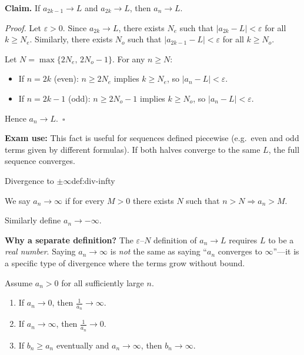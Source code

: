 \begin{examplebox}[title={Worked Example (Tutorial 7, Q3): If odd and even subsequences both converge to $L$, then $a_n\to L$}]

\textbf{Claim.} If $a_{2k-1}\to L$ and $a_{2k}\to L$, then $a_n\to L$.

\emph{Proof.}
Let $\varepsilon>0$. Since $a_{2k}\to L$, there exists $N_e$ such that $|a_{2k}-L|<\varepsilon$ for all $k\ge N_e$. Similarly, there exists $N_o$ such that $|a_{2k-1}-L|<\varepsilon$ for all $k\ge N_o$.

Let $N=\max\{2N_e,\,2N_o-1\}$. For any $n\ge N$:
\begin{itemize}[leftmargin=*]
\item If $n=2k$ (even): $n\ge 2N_e$ implies $k\ge N_e$, so $|a_n-L|<\varepsilon$.
\item If $n=2k-1$ (odd): $n\ge 2N_o-1$ implies $k\ge N_o$, so $|a_n-L|<\varepsilon$.
\end{itemize}
Hence $a_n\to L$.\ $\square$

\textbf{Exam use:} This fact is useful for sequences defined piecewise (e.g.\ even and odd terms given by different formulas). If both halves converge to the same $L$, the full sequence converges.

\end{examplebox}

\begin{definition}{Divergence to $\pm\infty$}{def:div-infty}

We say $a_n\to\infty$ if for every $M>0$ there exists $N$ such that $n>N\Rightarrow a_n>M$.

Similarly define $a_n\to -\infty$.

\end{definition}

\noindent
\textbf{Why a separate definition?}
The $\varepsilon$--$N$ definition of $a_n\to L$ requires $L$ to be a \emph{real number}. Saying $a_n\to\infty$ is \emph{not} the same as saying ``$a_n$ converges to $\infty$''---it is a specific type of divergence where the terms grow without bound.

\begin{keyformula}[title={Quick implications for positive sequences}]

Assume $a_n>0$ for all sufficiently large $n$.

\begin{enumerate}[label=(\roman*), leftmargin=3em]

\item If $a_n\to 0$, then $\displaystyle \frac{1}{a_n}\to \infty$.

\item If $a_n\to \infty$, then $\displaystyle \frac{1}{a_n}\to 0$.

\item If $b_n\ge a_n$ eventually and $a_n\to\infty$, then $b_n\to\infty$.

\end{enumerate}

\end{keyformula}

